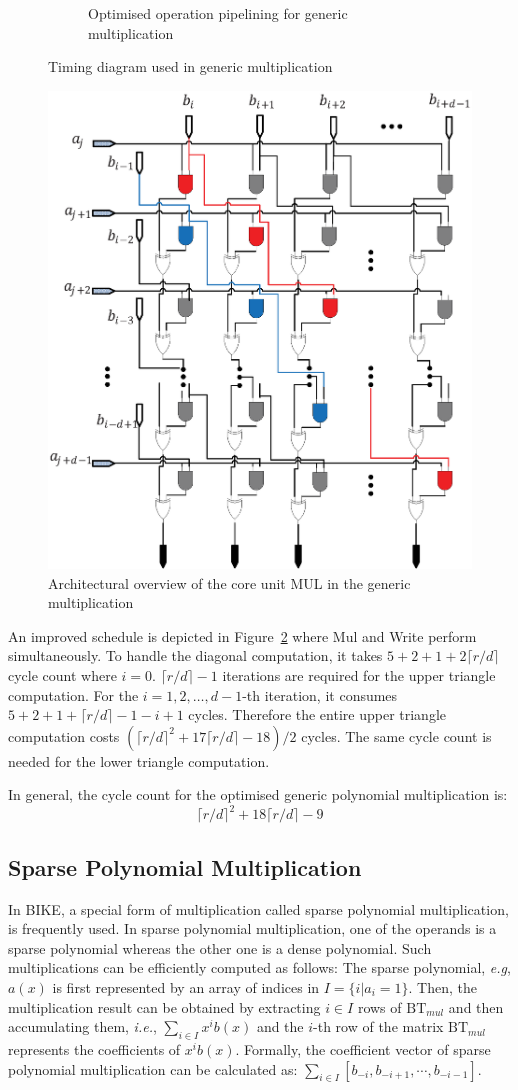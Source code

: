 \documentclass[runningheads]{llncs}
\begin{document}
\begin{figure}[!tb]
\begin{subfigure}[t]{0.47\textwidth}
\caption{Optimised operation pipelining for generic multiplication }
\label{fig:pipeline_gmul2}
\end{subfigure}
\caption{Timing diagram used in generic multiplication}
\end{figure}


\begin{figure}[!tb]
\centering
\includegraphics[width=.55\textwidth]{./fig/dsnmul_core.eps}
\caption{Architectural overview of the core unit MUL in the generic multiplication}\label{fig:gmul_core}
\end{figure}


An improved schedule is depicted in Figure~\ref{fig:pipeline_gmul2}
where Mul and Write perform simultaneously.
To handle the diagonal computation,
it takes $5+2+1+2\lceil r/d\rceil$ cycle count where $i=0$. $\lceil r/d\rceil -1$ iterations are required for the upper triangle computation.
For the $i=1,2,\ldots,d-1$-th iteration, it
consumes $5+2+1+\lceil r/d\rceil -1-i+1$ cycles.
Therefore the entire upper triangle computation costs $(\lceil r/d\rceil^2 +17\lceil r/d\rceil-18)/2$ cycles.
The same cycle count is needed for the lower triangle computation.

In general, the cycle count for the optimised generic polynomial multiplication is:
\[
\lceil r/d\rceil^2 + 18\lceil r/d\rceil - 9
\]



\subsection{Sparse Polynomial Multiplication}
\label{sub::sparse}
In BIKE, a special form of multiplication called sparse polynomial multiplication,
is frequently used. In sparse polynomial multiplication, one of the operands
is a sparse polynomial whereas the other one is a dense polynomial.
Such multiplications can be efficiently computed as follows:
The sparse polynomial, \textit{e.g}, $a(x)$ is first represented
by an array of indices in $I=\{i|a_i=1\}$.
Then, the multiplication result can be obtained by extracting $i\in I$ rows of $\text{BT}_{mul}$ and then accumulating them, \textit{i.e.}, $\sum_{i\in I} x^ib(x)$ and the $i$-th row of the matrix $\text{BT}_{mul}$ represents the coefficients of $x^ib(x)$. Formally, the coefficient vector of sparse polynomial multiplication can be calculated as:
$\sum_{i\in I} [b_{-i},b_{-i+1},\cdots,b_{-i-1}]$.
\end{document}
